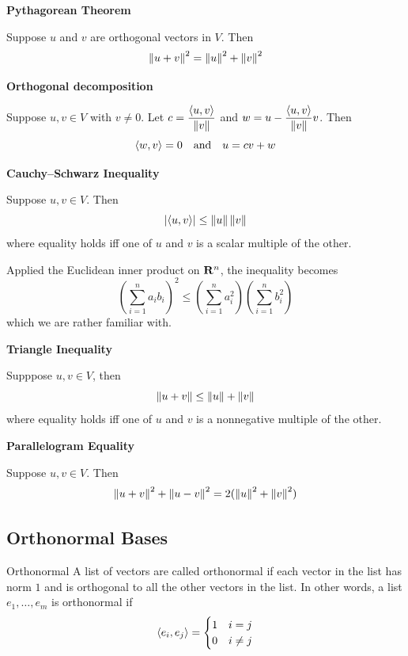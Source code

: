 \documentclass[12pt,a4paper]{article}
\begin{document}
    \begin{thm}
        \textbf{Pythagorean Theorem}
        
        Suppose $u$ and $v$ are orthogonal vectors in $V$. Then
        $$
        \left\lVert u+v\right\rVert^2=\left\lVert u\right\rVert^2+\left\lVert v\right\rVert^2
        $$
    \end{thm}
    \hfill

    \begin{prop}
        \textbf{Orthogonal decomposition}

        Suppose $u,v\in V$ with $v\neq0$. Let $c=\displaystyle\frac{\langle u,v\rangle}{\left\lVert v\right\rVert}$ and $\displaystyle w=u-\frac{\langle u,v\rangle}{\left\lVert v\right\rVert}v$. Then
        $$
        \langle w,v\rangle=0\quad\text{and}\quad u=cv+w
        $$
    \end{prop}
    \hfill

    \begin{thm}
        \textbf{Cauchy–Schwarz Inequality}

        Suppose $u,v\in V$. Then
        $$
        \left\lvert \langle u,v\rangle\right\rvert\leq\left\lVert u\right\rVert\left\lVert v\right\rVert
        $$
        where equality holds iff one of $u$ and $v$ is a scalar multiple of the other.
    \end{thm}
    \begin{remark}
        Applied the Euclidean inner product on $\mathbf{R}^n$, the inequality becomes
        $$
        (\sum_{i=1}^na_ib_i)^2\leq(\sum_{i=1}^na_i^2)(\sum_{i=1}^nb_i^2)
        $$
        which we are rather familiar with.
    \end{remark}
    \hfill

    \begin{thm}
        \textbf{Triangle Inequality}

        Supppose $u,v\in V$, then
        $$
        \left\lVert u+v\right\rVert\leq\left\lVert u\right\rVert+\left\lVert v\right\rVert
        $$
        where equality holds iff one of $u$ and $v$ is a nonnegative multiple of the other.
    \end{thm}
    \hfill

    \begin{thm}
        \textbf{Parallelogram Equality}

        Suppose $u,v\in V$. Then
        $$
        \left\lVert u+v\right\rVert^2+\left\lVert u-v\right\rVert^2=2(\left\lVert u\right\rVert^2+\left\lVert v\right\rVert^2)
        $$
    \end{thm}
    \hfill

    \subsection{Orthonormal Bases}
    \begin{defi}{Orthonormal}
        A list of vectors are called orthonormal if each vector in the list has norm $1$ and is orthogonal to all the other vectors in the list. In other words, a list $e_1,\dots,e_m$ is orthonormal if
        $$
        \langle e_{i},e_j\rangle=\begin{cases}1 & i=j\\0 & i\neq j\end{cases}
        $$
    \end{defi}
    \hfill
\end{document}
